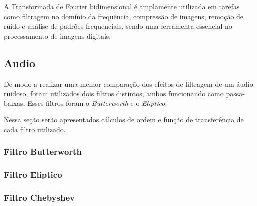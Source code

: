 A Transformada de Fourier bidimensional é amplamente utilizada em tarefas como filtragem no domínio da frequência, compressão de imagens, remoção de ruído e análise de padrões frequenciais, sendo uma ferramenta essencial no processamento de imagens digitais.

\subsection{Audio}
De modo a realizar uma melhor comparação dos efeitos de filtragem de um áudio ruidoso, foram utilizados dois filtros distintos, ambos funcionando como passa-baixas. Esses filtros foram o \textit{Butterworth} e o \textit{Elíptico}.

Nessa seção serão apresentados cálculos de ordem e função de transferência de cada filtro utilizado.

\subsubsection{Filtro Butterworth}


\subsubsection{Filtro Elíptico}


\subsubsection{Filtro Chebyshev}


